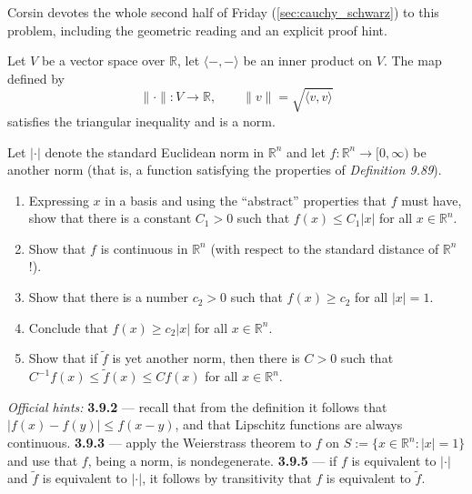 \begin{remark}
Corsin devotes the whole second half of Friday (\cref{sec:cauchy_schwarz}) to this problem,
including the geometric reading and an explicit proof hint.
\end{remark}

\begin{exercise}
\label{ex:3.8}
Let $V$ be a vector space over $\mathbb{R}$, let $\langle -,-\rangle$ be an inner product on $V$.
The map defined by
$$\|\cdot\| : V \to \mathbb{R}, \qquad \|v\| = \sqrt{\langle v,v\rangle}$$
satisfies the triangular inequality and is a norm.
\end{exercise}

\begin{exercise}
\label{ex:3.9}
Let $|\cdot|$ denote the standard Euclidean norm in $\mathbb{R}^n$ and let
$f : \mathbb{R}^n \to [0,\infty)$ be another norm (that is, a function satisfying the properties
of \textit{Definition 9.89}).
\begin{enumerate}[label=\textbf{\arabic*.}]
  \item Expressing $x$ in a basis and using the ``abstract'' properties that $f$ must have, show
    that there is a constant $C_1 > 0$ such that $f(x) \leq C_1|x|$ for all $x \in \mathbb{R}^n$.
  \item Show that $f$ is continuous in $\mathbb{R}^n$ (with respect to the standard distance of
    $\mathbb{R}^n$!).
  \item Show that there is a number $c_2 > 0$ such that $f(x) \geq c_2$ for all $|x| = 1$.
  \item Conclude that $f(x) \geq c_2|x|$ for all $x \in \mathbb{R}^n$.
  \item Show that if $\tilde f$ is yet another norm, then there is $C > 0$ such that
    $C^{-1}f(x) \leq \tilde f(x) \leq Cf(x)$ for all $x \in \mathbb{R}^n$.
\end{enumerate}
\textit{Official hints:} \textbf{3.9.2} --- recall that from the definition it follows that
$|f(x) - f(y)| \leq f(x-y)$, and that Lipschitz functions are always continuous. \textbf{3.9.3}
--- apply the Weierstrass theorem to $f$ on $S := \{x \in \mathbb{R}^n : |x| = 1\}$ and use that
$f$, being a norm, is nondegenerate. \textbf{3.9.5} --- if $f$ is equivalent to $|\cdot|$ and
$\tilde f$ is equivalent to $|\cdot|$, it follows by transitivity that $f$ is equivalent to
$\tilde f$.
\end{exercise}

